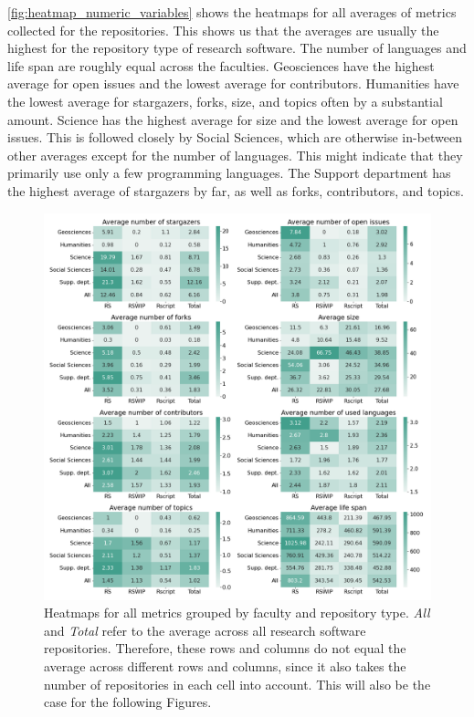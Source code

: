 \autoref{fig:heatmap_numeric_variables} shows the heatmaps for all averages of metrics collected for the repositories. This shows us that the averages are usually the highest for the repository type of research software. The number of languages and life span are roughly equal across the faculties. Geosciences have the highest average for open issues and the lowest average for contributors. Humanities have the lowest average for stargazers, forks, size, and topics often by a substantial amount. Science has the highest average for size and the lowest average for open issues. 
This is followed closely by Social Sciences, which are otherwise in-between other averages except for the number of languages. This might indicate that they primarily use only a few programming languages. The Support department has the highest average of stargazers by far, as well as forks, contributors, and topics.

\begin{figure}[tbph!]
\centerline{
\includegraphics[scale=0.5]{figures_results/heatmap_numeric_variables.png}}
\caption{Heatmaps for all metrics grouped by faculty and repository type. \textit{All} and \textit{Total} refer to the average across all research software repositories. Therefore, these rows and columns do not equal the average across different rows and columns, since it also takes the number of repositories in each cell into account. This will also be the case for the following Figures.
\label{fig:heatmap_numeric_variables}}
\end{figure}


